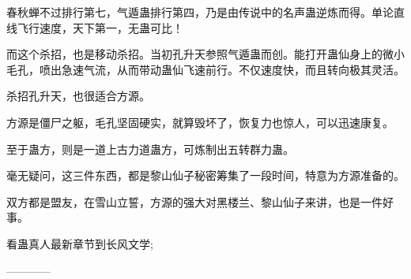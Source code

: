 \begin{this_body}
春秋蝉不过排行第七，气遁蛊排行第四，乃是由传说中的名声蛊逆炼而得。单论直线飞行速度，天下第一，无蛊可比！

而这个杀招，也是移动杀招。当初孔升天参照气遁蛊而创。能打开蛊仙身上的微小毛孔，喷出急速气流，从而带动蛊仙飞速前行。不仅速度快，而且转向极其灵活。

杀招孔升天，也很适合方源。

方源是僵尸之躯，毛孔坚固硬实，就算毁坏了，恢复力也惊人，可以迅速康复。

至于蛊方，则是一道上古力道蛊方，可炼制出五转群力蛊。

毫无疑问，这三件东西，都是黎山仙子秘密筹集了一段时间，特意为方源准备的。

双方都是盟友，在雪山立誓，方源的强大对黑楼兰、黎山仙子来讲，也是一件好事。

看蛊真人最新章节到长风文学;

------------

\end{this_body}

